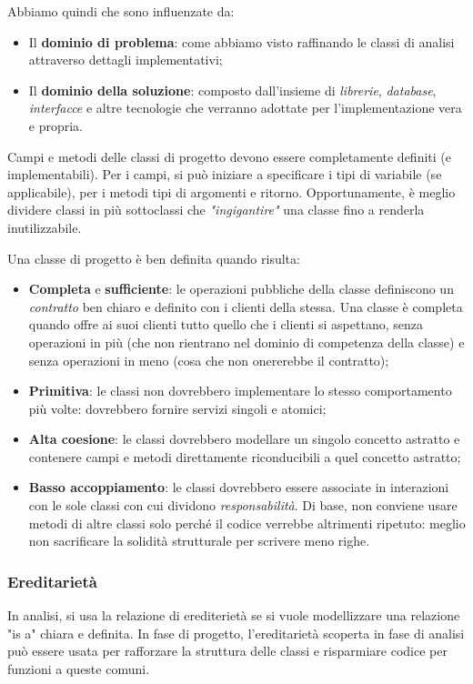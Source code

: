 \documentclass[a4paper,11pt]{article}
\begin{document}
Abbiamo quindi che sono influenzate da:
\begin{itemize}
	\item Il \textbf{dominio di problema}: come abbiamo visto raffinando le classi di analisi attraverso dettagli implementativi;
	\item Il \textbf{dominio della soluzione}: composto dall'insieme di \textit{librerie}, \textit{database}, \textit{interfacce} e altre tecnologie che verranno adottate per l'implementazione vera e propria.
\end{itemize}

Campi e metodi delle classi di progetto devono essere completamente definiti (e implementabili). Per i campi, si può iniziare a specificare i tipi di variabile (se applicabile), per i metodi tipi di argomenti e ritorno.
Opportunamente, è meglio dividere classi in più sottoclassi che \textit{"ingigantire"} una classe fino a renderla inutilizzabile.

Una classe di progetto è ben definita quando risulta:
\begin{itemize}
	\item \textbf{Completa} e \textbf{sufficiente}: le operazioni pubbliche della classe definiscono un \textit{contratto} ben chiaro e definito con i clienti della stessa.
		Una classe è completa quando offre ai suoi clienti tutto quello che i clienti si aspettano, senza operazioni in più (che non rientrano nel dominio di competenza della classe) e senza operazioni in meno (cosa che non onererebbe il contratto);
	\item \textbf{Primitiva}: le classi non dovrebbero implementare lo stesso comportamento più volte: dovrebbero fornire servizi singoli e atomici;
	\item \textbf{Alta coesione}: le classi dovrebbero modellare un singolo concetto astratto e contenere campi e metodi direttamente riconducibili a quel concetto astratto;
	\item \textbf{Basso accoppiamento}: le classi dovrebbero essere associate in interazioni con le sole classi con cui dividono \textit{responsabilità}. Di base, non conviene usare metodi di altre classi solo perché il codice verrebbe altrimenti ripetuto: meglio non sacrificare la solidità strutturale per scrivere meno righe.
\end{itemize}

\subsubsection{Ereditarietà}
In analisi, si usa la relazione di erediterietà se si vuole modellizzare una relazione "is a" chiara e definita.
In fase di progetto, l'ereditarietà scoperta in fase di analisi può essere usata per rafforzare la struttura delle classi e risparmiare codice per funzioni a queste comuni.
\end{document}
